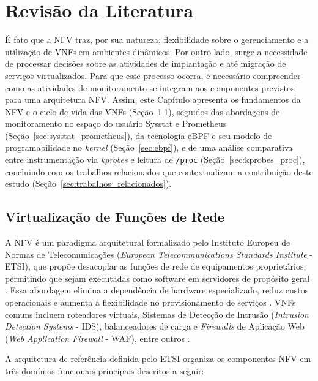 \chapter{Revisão da Literatura}
\label{chap:revisao_literatura}

É fato que a NFV traz, por sua natureza, flexibilidade sobre o gerenciamento e a utilização de VNFs em ambientes dinâmicos. Por outro lado, surge a necessidade de processar decisões sobre as atividades de implantação e até migração de serviços virtualizados. Para que esse processo ocorra, é necessário compreender como as atividades de monitoramento se integram aos componentes previstos para uma arquitetura NFV. Assim, este Capítulo apresenta os fundamentos da NFV e o ciclo de vida das VNFs (Seção~\ref{sec:nfv}), seguidos das abordagens de monitoramento no espaço do usuário Sysstat e Prometheus (Seção~\ref{sec:sysstat_prometheus}), da tecnologia eBPF e seu modelo de programabilidade no \textit{kernel} (Seção~\ref{sec:ebpf}), e de uma análise comparativa entre instrumentação via \textit{kprobes} e leitura de \texttt{/proc} (Seção~\ref{sec:kprobes_proc}), concluindo com os trabalhos relacionados que contextualizam a contribuição deste estudo (Seção~\ref{sec:trabalhos_relacionados}).

\section{Virtualização de Funções de Rede}
\label{sec:nfv}

A NFV é um paradigma arquitetural formalizado pelo Instituto Europeu de Normas de Telecomunicações (\textit{European Telecommunications Standards Institute} - ETSI), que propõe desacoplar as funções de rede de equipamentos proprietários, permitindo que sejam executadas como software em servidores de propósito geral \cite{etsi_nfv_002_2014, etsi_nfv_006_2024, mijumbi2016}. Essa abordagem elimina a dependência de hardware especializado, reduz custos operacionais e aumenta a flexibilidade no provisionamento de serviços \cite{7045396, 10.1145/3397022}. VNFs comuns incluem roteadores virtuais, Sistemas de Detecção de Intrusão (\textit{Intrusion Detection Systems} - IDS), balanceadores de carga e \textit{Firewalls} de Aplicação Web (\textit{Web Application Firewall} - WAF), entre outros \cite{10.1145/3172866}.

A arquitetura de referência definida pelo ETSI organiza os componentes NFV em três domínios funcionais principais \cite{etsi_nfv_002_2014, etsi_nfv_006_2024, mijumbi2016, repec:wly:intnem:v:31:y:2021:i:5:n:e2068} descritos a seguir:

